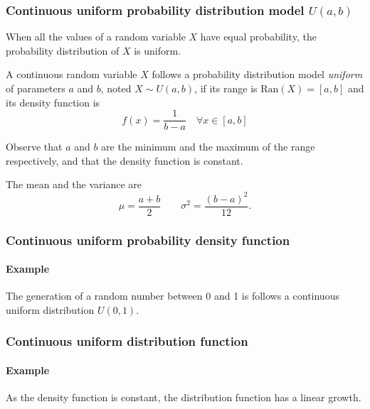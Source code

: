 \begin{frame}
\frametitle{Continuous uniform probability distribution model $U(a,b)$}
When all the values of a random variable $X$ have equal probability, the probability distribution of $X$ is uniform.

\begin{definition}
A continuous random variable $X$ follows a probability distribution model \emph{uniform} of parameters $a$ and
$b$, noted $X\sim U(a,b)$, if its range is $\mbox{Ran}(X) = [a,b]$ and its density function is
\[
f(x)= \frac{1}{b-a}\quad \forall x\in [a,b]
\]
\end{definition}

Observe that $a$ and $b$ are the minimum and the maximum of the range respectively, and that the density function is constant. 

The mean and the variance are
\[
\mu = \frac{a+b}{2}\qquad \sigma^2=\frac{(b-a)^2}{12}.
\]
\end{frame}


\begin{frame}
\frametitle{Continuous uniform probability density function}
\framesubtitle{Example}

The generation of a random number between 0 and 1 is follows a continuous uniform distribution $U(0,1)$.
\begin{center}
\end{center}
\end{frame}


\begin{frame}
\frametitle{Continuous uniform distribution function}
\framesubtitle{Example}
As the density function is constant, the distribution function has a linear growth. 
\begin{center}
\end{center}
\end{frame}


